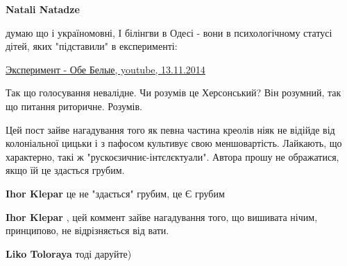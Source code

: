 \begin{itemize}
\begin{itemize}
\textbf{Natali Natadze} 

думаю що і україномовні, І білінгви в Одесі - вони в психологічному статусі
дітей, яких "підставили" в експерименті: 

\href{https://m.youtube.com/watch?v=TwVp3S3HQtg}{%
Эксперимент - Обе Белые, youtube, 13.11.2014%
}

Так що голосування невалідне. Чи розумів це Херсонський? Він розумний, так що
питання риторичне. Розумів.

\end{itemize}

 

Цей пост зайве нагадування того як певна частина креолів ніяк не відійде від
колоніальної цицьки і з пафосом культивує свою меншовартість. Лайкають, що
характерно, такі ж "рускоєзичниє-інтєлєктуали". Автора прошу не ображатися,
якщо їй це здасться грубим.

\begin{itemize}
 
\textbf{Ihor Klepar} це не "здається" грубим, це Є грубим

 
\textbf{Ihor Klepar} , цей коммент зайве нагадування того, що вишивата нічим, принципово, не відрізняється від вати.

 
\textbf{Liko Toloraya} тоді даруйте)

 

\end{itemize}
\end{itemize}

